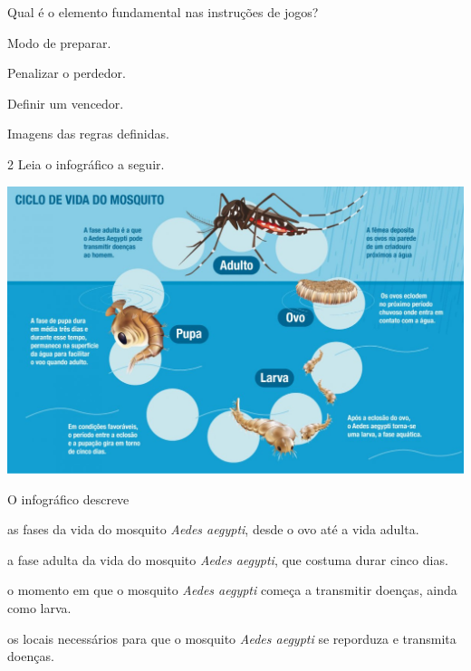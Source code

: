 Qual é o elemento fundamental nas instruções de jogos?

\begin{escolha}
\item Modo de preparar.

\item Penalizar o perdedor.

\item Definir um vencedor.

\item Imagens das regras definidas.
\end{escolha}

\num{2} Leia o infográfico a seguir.

\vspace{2em}

\includegraphics[width=\textwidth]{media/image37.jpeg}


\vspace{2em}

O infográfico descreve

\begin{escolha}
\item as fases da vida do mosquito \emph{Aedes aegypti}, desde o ovo até a vida adulta.

\item a fase adulta da vida do mosquito \emph{Aedes aegypti}, que costuma durar cinco dias.

\item o momento em que o mosquito \emph{Aedes aegypti} começa a transmitir doenças, ainda como larva.

\item os locais necessários para que o mosquito \emph{Aedes aegypti} se reporduza e transmita doenças.
\end{escolha}

